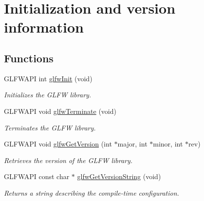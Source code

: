 \hypertarget{group__init}{\section{\-Initialization and version information}
\label{group__init}
}
\subsection*{\-Functions}
\begin{DoxyCompactItemize}
\item 
\-G\-L\-F\-W\-A\-P\-I int \hyperlink{group__init_gab41771f0215a2e0afb4cf1cf98082d40}{glfw\-Init} (void)
\begin{DoxyCompactList}\small\item\em \-Initializes the \-G\-L\-F\-W library. \end{DoxyCompactList}\item 
\-G\-L\-F\-W\-A\-P\-I void \hyperlink{group__init_gafd90e6fd4819ea9e22e5e739519a6504}{glfw\-Terminate} (void)
\begin{DoxyCompactList}\small\item\em \-Terminates the \-G\-L\-F\-W library. \end{DoxyCompactList}\item 
\-G\-L\-F\-W\-A\-P\-I void \hyperlink{group__init_ga2402c7824ac0194c13722790ff9559ff}{glfw\-Get\-Version} (int $\ast$major, int $\ast$minor, int $\ast$rev)
\begin{DoxyCompactList}\small\item\em \-Retrieves the version of the \-G\-L\-F\-W library. \end{DoxyCompactList}\item 
\-G\-L\-F\-W\-A\-P\-I const char $\ast$ \hyperlink{group__init_ga4b9092ac5eace57d94d3cd551d6b8ded}{glfw\-Get\-Version\-String} (void)
\begin{DoxyCompactList}\small\item\em \-Returns a string describing the compile-\/time configuration. \end{DoxyCompactList}\end{DoxyCompactItemize}
